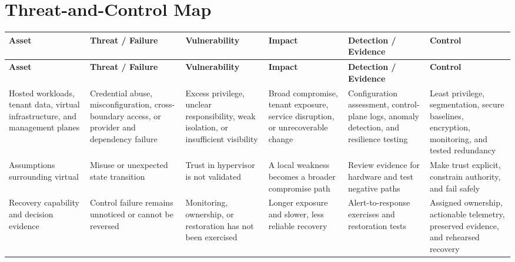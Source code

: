 \documentclass[11pt]{article}
\begin{document}
\section*{Threat-and-Control Map}
\begingroup\scriptsize\setlength{\tabcolsep}{2pt}
\begin{longtable}{>{\RaggedRight\arraybackslash}p{}>{\RaggedRight\arraybackslash}p{}>{\RaggedRight\arraybackslash}p{}>{\RaggedRight\arraybackslash}p{}>{\RaggedRight\arraybackslash}p{}>{\RaggedRight\arraybackslash}p{}}
\toprule\rowcolor{Navy}\color{white}\textbf{Asset} & \color{white}\textbf{Threat / Failure} & \color{white}\textbf{Vulnerability} & \color{white}\textbf{Impact} & \color{white}\textbf{Detection / Evidence} & \color{white}\textbf{Control}\\\midrule
\endfirsthead
\toprule\rowcolor{Navy}\color{white}\textbf{Asset} & \color{white}\textbf{Threat / Failure} & \color{white}\textbf{Vulnerability} & \color{white}\textbf{Impact} & \color{white}\textbf{Detection / Evidence} & \color{white}\textbf{Control}\\\midrule
\endhead
Hosted workloads, tenant data, virtual infrastructure, and management planes & Credential abuse, misconfiguration, cross-boundary access, or provider and dependency failure & Excess privilege, unclear responsibility, weak isolation, or insufficient visibility & Broad compromise, tenant exposure, service disruption, or unrecoverable change & Configuration assessment, control-plane logs, anomaly detection, and resilience testing & Least privilege, segmentation, secure baselines, encryption, monitoring, and tested redundancy\\\midrule
Assumptions surrounding virtual & Misuse or unexpected state transition & Trust in hypervisor is not validated & A local weakness becomes a broader compromise path & Review evidence for hardware and test negative paths & Make trust explicit, constrain authority, and fail safely\\\midrule
Recovery capability and decision evidence & Control failure remains unnoticed or cannot be reversed & Monitoring, ownership, or restoration has not been exercised & Longer exposure and slower, less reliable recovery & Alert-to-response exercises and restoration tests & Assigned ownership, actionable telemetry, preserved evidence, and rehearsed recovery\\\midrule
\bottomrule
\end{longtable}
\endgroup
\end{document}
